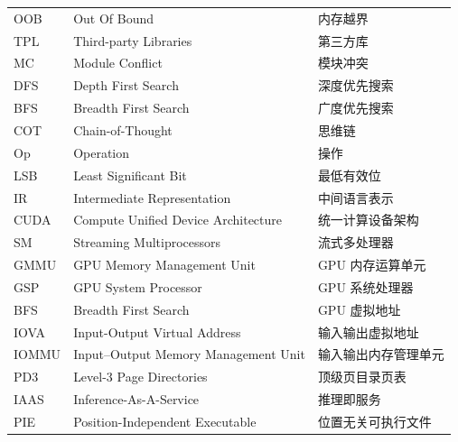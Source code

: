 \begin{center}
\begin{longtable}{m{2cm}m{8cm}m{5cm}}
        OOB&Out Of Bound&内存越界\\
        TPL&Third-party Libraries&第三方库\\
        MC&Module Conflict&模块冲突\\
        DFS&Depth First Search&深度优先搜索\\
        BFS&Breadth First Search&广度优先搜索\\
        COT&Chain-of-Thought&思维链\\
        Op&Operation&操作\\
        LSB&Least Significant Bit&最低有效位\\
        IR&Intermediate Representation&中间语言表示\\
        CUDA&Compute Unified Device Architecture&统一计算设备架构\\
        SM&Streaming Multiprocessors&流式多处理器\\
        GMMU&GPU Memory Management Unit&GPU 内存运算单元\\
        GSP&GPU System Processor&GPU 系统处理器\\
        BFS&Breadth First Search&GPU 虚拟地址\\
        IOVA&Input-Output Virtual Address&输入输出虚拟地址\\
        IOMMU&Input–Output Memory Management Unit&输入输出内存管理单元\\
        PD3&Level-3 Page Directories&顶级页目录页表\\
        IAAS&Inference-As-A-Service&推理即服务\\
        PIE&Position-Independent Executable&位置无关可执行文件\\
	\end{longtable}
\end{center}